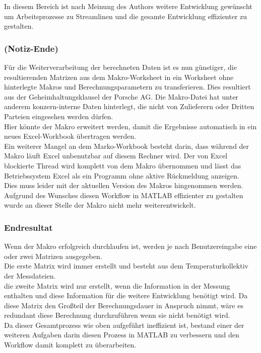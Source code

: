 In diesem Bereich ist nach Meinung des Authors weitere Entwicklung gewünscht um Arbeitsprozesse zu Streamlinen und die gesamte Entwicklung effizienter zu gestalten.

\subsubsection*{(Notiz-Ende)}

Für die Weiterverarbeitung der berechneten Daten ist es nun günstiger, die resultierenden Matrizen aus dem Makro-Worksheet in ein Worksheet ohne hinterlegte Makros und Berechnungsparametern zu transferieren. Dies resultiert aus der Geheimhaltungsklausel der Porsche AG. Die Makro-Datei hat unter anderem konzern-interne Daten hinterlegt, die nicht von Zulieferern oder Dritten Parteien eingesehen werden dürfen.\\
Hier könnte der Makro erweitert werden, damit die Ergebnisse automatisch in ein neues Excel-Workbook übertragen werden.\\

Ein weiterer Mangel an dem Marko-Workbook besteht darin, dass während der Makro läuft Excel unbenutzbar auf diesem Rechner wird. Der von Excel blockierte Thread wird komplett von dem Makro übernommen und lässt das Betriebssystem Excel als ein Programm ohne aktive Rückmeldung anzeigen. \\
Dies muss leider mit der aktuellen Version des Makros hingenommen werden.\\
Aufgrund des Wunsches diesen Workflow in MATLAB effizienter zu gestalten wurde an dieser Stelle der Makro nicht mehr weiterentwickelt. 

\subsubsection{Endresultat}
\label{Endresultat}

Wenn der Makro erfolgreich durchlaufen ist, werden je nach Benutzereingabe eine oder zwei Matrizen ausgegeben. \\
Die erste Matrix wird immer erstellt und besteht aus dem Temperaturkollektiv der Messdateien. \\
die zweite Matrix wird nur erstellt, wenn die Information in der Messung enthalten und diese Information für die weitere Entwicklung benötigt wird. Da diese Matrix den Großteil der Berechnungsdauer in Anspruch nimmt, wäre es redundant diese Berechnung durchzuführen wenn sie nicht benötigt wird.\\
Da dieser Gesamtprozess wie oben aufgeführt ineffizient ist, bestand einer der weiteren Aufgaben darin diesen Prozess in MATLAB zu verbessern und den Workflow damit komplett zu überarbeiten.

